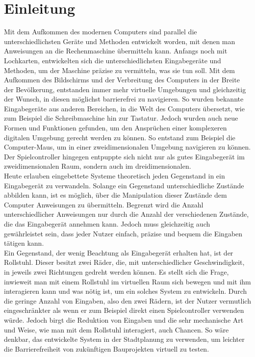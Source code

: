 \chapter{Einleitung}
Mit dem Aufkommen des modernen Computers sind parallel die unterschiedlichsten Geräte und Methoden entwickelt worden, mit denen man Anweisungen an die Rechenmaschine übermitteln kann.
Anfangs noch mit Lochkarten, entwickelten sich die unterschiedlichsten Eingabegeräte und Methoden, um der Maschine präzise zu vermitteln, was sie tun soll.
Mit dem Aufkommen des Bildschirms und der Verbreitung des Computers in der Breite der Bevölkerung, entstanden immer mehr virtuelle Umgebungen und gleichzeitig der Wunsch, in diesen möglichst barrierefrei zu navigieren.
So wurden bekannte Eingabegeräte aus anderen Bereichen, in die Welt des Computers übersetzt, wie zum Beispiel die Schreibmaschine hin zur Tastatur.
Jedoch wurden auch neue Formen und Funktionen gefunden, um den Ansprüchen einer komplexeren digitalen Umgebung gerecht werden zu können. So entstand zum Beispiel die Computer-Maus, um in einer zweidimensionalen Umgebung navigieren zu können.
Der Spielcontroller hingegen entpuppte sich nicht nur als gutes Eingabegerät im zweidimensionalen Raum, sondern auch im dreidimensionalen.\\
Heute erlauben eingebettete Systeme theoretisch jeden Gegenstand in ein Eingabegerät zu verwandeln.
Solange ein Gegenstand unterschiedliche Zustände abbilden kann, ist es möglich, über die Manipulation dieser Zustände dem Computer Anweisungen zu übermitteln.
Begrenzt wird die Anzahl unterschiedlicher Anweisungen nur durch die Anzahl der verschiedenen Zustände, die das Eingabegerät annehmen kann.
Jedoch muss gleichzeitig auch gewährleistet sein, dass jeder Nutzer einfach, präzise und bequem die Eingaben tätigen kann.\\
Ein Gegenstand, der wenig Beachtung als Eingabegerät erhalten hat, ist der Rollstuhl.
Dieser besitzt zwei Räder, die, mit unterschiedlicher Geschwindigkeit, in jeweils zwei Richtungen gedreht werden können.
Es stellt sich die Frage, inwieweit man mit einem Rollstuhl im virtuellen Raum sich bewegen und mit ihm interagieren kann und was nötig ist, um ein solches System zu entwickeln.
Durch die geringe Anzahl von Eingaben, also den zwei Rädern, ist der Nutzer vermutlich eingeschränkter als wenn er zum Beispiel direkt einen Spielcontroller verwenden würde.
Jedoch birgt die Reduktion von Eingaben und die sehr mechanische Art und Weise, wie man mit dem Rollstuhl interagiert, auch Chancen. So wäre denkbar, das entwickelte System in der Stadtplanung zu verwenden, um leichter die Barrierefreiheit von zukünftigen Bauprojekten virtuell zu testen.
